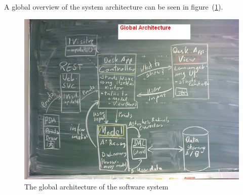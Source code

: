 
A global overview of the system architecture can be seen in 
figure~(\ref{fig:globalarchitecture}).
\begin{figure}[htbp]
\begin{center}
\includegraphics[scale=0.5]{images/TechnicalDesign/GlobalArchitecture.png}
\caption{The global architecture of the software system}
\label{fig:globalarchitecture}
\end{center}
\end{figure}

